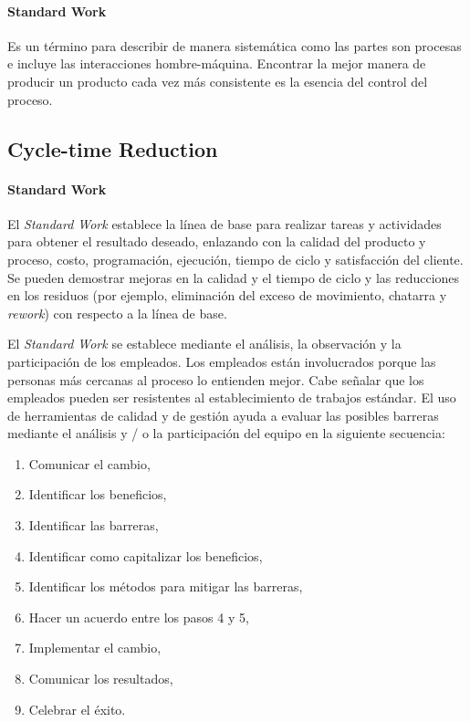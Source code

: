 \documentclass[]{article}
\begin{document}
\paragraph{Standard Work}
Es un término para describir de manera sistemática como las partes son procesas e incluye las interacciones hombre-máquina. Encontrar la mejor manera de producir un producto cada vez más consistente es la esencia del control del proceso.

\subsection{Cycle-time Reduction}

\paragraph{Standard Work}
El \textit{Standard Work} establece la línea de base para realizar tareas y actividades para obtener el resultado deseado, enlazando con la calidad del producto y proceso, costo, programación, ejecución, tiempo de ciclo y satisfacción del cliente. Se pueden demostrar mejoras en la calidad y el tiempo de ciclo y las reducciones en los residuos (por ejemplo, eliminación del exceso de movimiento, chatarra y \textit{rework}) con respecto a la línea de base.

El \textit{Standard Work} se establece mediante el análisis, la observación y la participación de los empleados. Los empleados están involucrados porque las personas más cercanas al proceso lo entienden mejor. Cabe señalar que los empleados pueden ser resistentes al establecimiento de trabajos estándar. El uso de herramientas de calidad y de gestión ayuda a evaluar las posibles barreras mediante el análisis y / o la participación del equipo en la siguiente secuencia:

\begin{enumerate}
	\item Comunicar el cambio,
	\item Identificar los beneficios,
	\item Identificar las barreras,
	\item Identificar como capitalizar los beneficios,
	\item Identificar los métodos para mitigar las barreras,
	\item Hacer un acuerdo entre los pasos 4 y 5,
	\item Implementar el cambio,
	\item Comunicar los resultados,
	\item Celebrar el éxito.
\end{enumerate}
\end{document}
